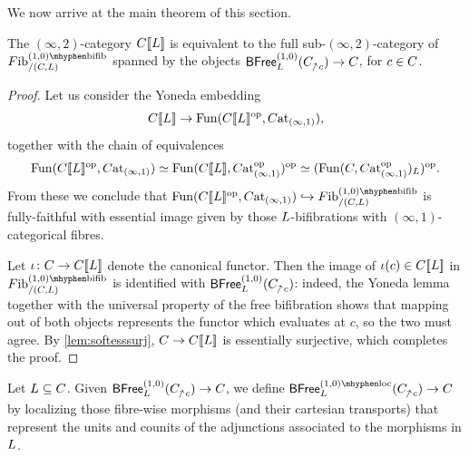\documentclass[a4paper,reqno,twoside]{amsart}
\begin{document}
We now arrive at the main theorem of this section.

\begin{theorem}\label{thm:addingadjoints}
	The $(\infty,2)$-category $\relax{C}[\![\relax{L}]\!]$ is equivalent to the full sub-$(\infty,2)$-category of $\Fib^{(1,0)\mhyphen\bifib}_{/(\cC,\cL)}$ spanned by the objects $\BFree^{(1,0)}_{\cL}(\cC_{\upslash c}) \to \cC$, for $c\in \relax{C}$.
\end{theorem}
\begin{proof}
	Let us consider the Yoneda embedding
	\[
		\relax{C}[\![\relax{L}]\!] \to \mathrm{Fun}(\relax{C}[\![\relax{L}]\!]^{\mathrm{op}},\relax{C}\mathrm{at}_{(\infty,1)}),
	\]
	together with the chain of equivalences
	 \[
		\mathrm{Fun}(\relax{C}[\![\relax{L}]\!]^{\mathrm{op}},\relax{C}\mathrm{at}_{(\infty,1)}) \simeq \mathrm{Fun}(\relax{C}[\![\relax{L}]\!],\relax{C}\mathrm{at}_{(\infty,1)}^{\mathrm{op}})^{\mathrm{op}} \simeq (\mathrm{Fun}(\relax{C},\relax{C}\mathrm{at}_{(\infty,1)}^{\mathrm{op}})_{\relax{L}})^{\mathrm{op}}.
	 \]
	 From these we conclude that $\Fun(\cC\soft{\cL}^\op,\Cat_{(\infty,1)}) \hookrightarrow \Fib^{(1,0)\mhyphen\bifib}_{/(\cC,\cL)}$ is fully-faithful with essential image given by those $\relax{L}$-bifibrations with $(\infty,1)$-categorical fibres.

	 Let $\iota \colon \relax{C} \to \relax{C}[\![\relax{L}]\!]$ denote the canonical functor. Then the image of $\iota(c) \in \relax{C}[\![\relax{L}]\!]$ in $ \Fib^{(1,0)\mhyphen\bifib}_{/(\cC,\cL)}$ is identified with $\BFree^{(1,0)}_{\cL}(\cC_{\upslash c})$: indeed, the Yoneda lemma together with the universal property of the free bifibration shows that mapping out of both objects represents the functor which evaluates at $c$, so the two must agree. By \cref{lem:softesssurj}, $\relax{C} \to \relax{C}[\![\relax{L}]\!]$ is essentially surjective, which completes the proof.
\end{proof}



\begin{definition}\label{def:Bfreeloc}
	Let $\relax{L} \subseteq \relax{C}$. Given $\BFree^{(1,0)}_{\cL}(\cC_{\upslash c}) \to \cC$, we define $\BFree^{(1,0)\mhyphen\loc}_{\cL}(\cC_{\upslash c}) \to \cC$ by localizing those fibre-wise morphisms (and their cartesian transports) that represent the units and counits of the adjunctions associated to the morphisms in $\relax{L}$.
\end{definition}
\end{document}
